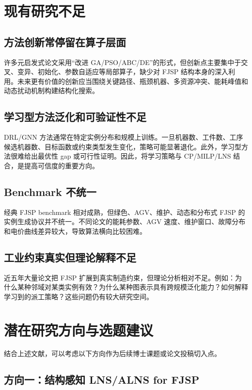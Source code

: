 \documentclass[UTF8,a4paper,11pt]{ctexart}
\begin{document}
\section{现有研究不足}

\subsection{方法创新常停留在算子层面}

许多元启发式论文采用“改进 GA/PSO/ABC/DE”的形式，但创新点主要集中于交叉、变异、初始化、参数自适应等局部算子，缺少对 FJSP 结构本身的深入利用。未来更有价值的创新应当围绕关键路径、瓶颈机器、多资源冲突、能耗峰值和动态扰动机制构建结构化搜索。

\subsection{学习型方法泛化和可验证性不足}

DRL/GNN 方法通常在特定实例分布和规模上训练。一旦机器数、工件数、工序候选机器数、目标函数或约束类型发生变化，策略可能显著退化。此外，学习型方法很难给出最优性 gap 或可行性证明。因此，将学习策略与 CP/MILP/LNS 结合，是提高可信度的重要方向。

\subsection{Benchmark 不统一}

经典 FJSP benchmark 相对成熟，但绿色、AGV、维护、动态和分布式 FJSP 的实例生成协议并不统一。不同论文的能耗参数、AGV 速度、维护窗口、故障分布和电价曲线差异较大，导致算法横向比较困难。

\subsection{工业约束真实但理论解释不足}

近五年大量论文把 FJSP 扩展到真实制造约束，但理论分析相对不足。例如：为什么某种邻域对某类实例有效？为什么某种图表示具有跨规模泛化能力？如何解释学习到的派工策略？这些问题仍有较大研究空间。

\section{潜在研究方向与选题建议}

结合上述文献，可以考虑以下方向作为后续博士课题或论文投稿切入点。

\subsection{方向一：结构感知 LNS/ALNS for FJSP}
\end{document}

